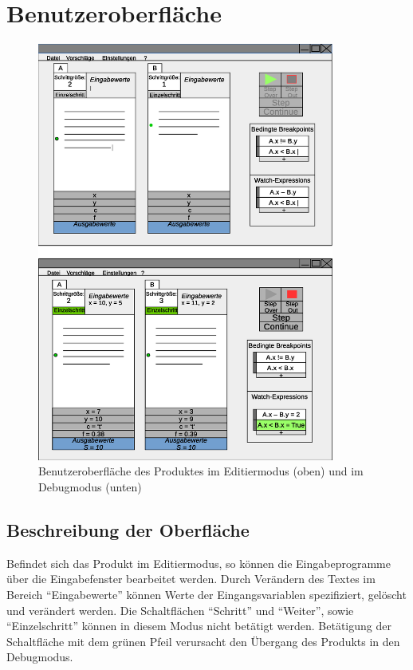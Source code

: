 \documentclass[parskip=full]{scrartcl}
\begin{document}
	
\newpage
\section{Benutzeroberfläche}
\begin{figure}[!ht] 
    \vspace{-10pt}
    \centering
       \includegraphics[width=0.87\textwidth]{skizzeFull.eps}
       \caption{
         Benutzeroberfläche des Produktes im Editiermodus (oben) und im Debugmodus
         (unten)
       }
    \label{fig:Bild4}
\end{figure}

\newpage
    \subsection{Beschreibung der Oberfläche}
        Befindet sich das Produkt im \gls{Editiermodus}, so können die Eingabeprogramme über die 
        Eingabefenster bearbeitet werden.
        Durch Verändern des Textes im Bereich \enquote{Eingabewerte} können Werte der Eingangsvariablen
        spezifiziert, gelöscht und verändert werden. 
        Die Schaltflächen \enquote{\gls{Schritt}} und \enquote{Weiter}, sowie \enquote{\gls{Einzelschritt}} können in diesem Modus nicht betätigt
        werden. Betätigung der Schaltfläche mit dem grünen Pfeil verursacht den Übergang des Produkts in den Debugmodus.
        
\end{document}
